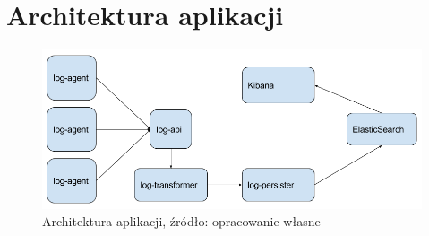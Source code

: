 \section{Architektura aplikacji}
\label{chapter:application:architecture}

\begin{figure}[H]
    \centering
    \includegraphics[width=1.0\textwidth]{images/application_arch}
    \caption[Architektura aplikacji]{
        Architektura aplikacji, źródło: opracowanie własne
    }
    \label{chapter:application:architecture:diagram}
\end{figure}

